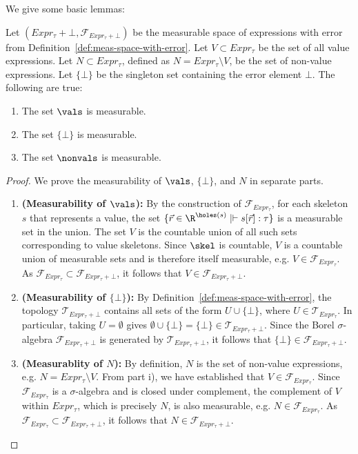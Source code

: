We give some basic lemmas:
\begin{lemma}
	Let $(Expr_{\tau} + \bot, \mathcal{F}_{Expr_{\tau} + \bot})$ be the measurable space of expressions with error from Definition~\ref{def:meas-space-with-error}. Let $V \subset Expr_{\tau}$ be the set of all value expressions. Let $N \subset Expr_{\tau}$, defined as $N = Expr_{\tau} \setminus V$, be the set of non-value expressions. Let $\{\bot\}$ be the singleton set containing the error element $\bot$. The following are true:
	\begin{enumerate}
		\item The set $\vals$ is measurable.
		\item The set $\{\bot\}$ is measurable.
		\item The set $\nonvals$ is measurable.
	\end{enumerate}
\end{lemma}

\begin{proof}
	We prove the measurability of $\vals$, $\{\bot\}$, and $N$ in separate parts.
	\begin{enumerate}
		\item \textbf{(Measurability of $\vals$):} By the construction of $\mathcal{F}_{Expr_{\tau}}$, for each skeleton $s$ that represents a value, the set $\{\vec{r} \in \R^{\holes(s)} \mid \vdash s[\vec{r}] : \tau\}$ is a measurable set in the union. The set $V$ is the countable union of all such sets corresponding to value skeletons. Since $\skel$ is countable, $V$ is a countable union of measurable sets and is therefore itself measurable, e.g. $V \in \mathcal{F}_{Expr_{\tau}}$. As $\mathcal{F}_{Expr_{\tau}} \subset \mathcal{F}_{Expr_{\tau} + \bot}$, it follows that $V \in \mathcal{F}_{Expr_{\tau} + \bot}$.
		
		\item \textbf{(Measurability of $\{\bot\}$):} By Definition~\ref{def:meas-space-with-error}, the topology $\mathcal{T}_{Expr_{\tau} + \bot}$ contains all sets of the form $U \cup \{\bot\}$, where $U \in \mathcal{T}_{Expr_{\tau}}$. In particular, taking $U = \emptyset$ gives $\emptyset \cup \{\bot\} = \{\bot\} \in \mathcal{T}_{Expr_{\tau} + \bot}$. Since the Borel $\sigma$-algebra $\mathcal{F}_{Expr_{\tau} + \bot}$ is generated by $\mathcal{T}_{Expr_{\tau} + \bot}$, it follows that $\{\bot\} \in \mathcal{F}_{Expr_{\tau} + \bot}$.

		\item \textbf{(Measurablity of $N$):} By definition, $N$ is the set of non-value expressions, e.g. $N = Expr_{\tau} \setminus V$. From part i), we have established that $V \in \mathcal{F}_{Expr_{\tau}}$. Since $\mathcal{F}_{Expr_{\tau}}$ is a $\sigma$-algebra and is closed under complement, the complement of $V$ within $Expr_{\tau}$, which is precisely $N$, is also measurable, e.g. $N \in \mathcal{F}_{Expr_{\tau}}$. As $\mathcal{F}_{Expr_{\tau}} \subset \mathcal{F}_{Expr_{\tau} + \bot}$, it follows that $N \in \mathcal{F}_{Expr_{\tau} + \bot}$.
	\end{enumerate}
\end{proof}

